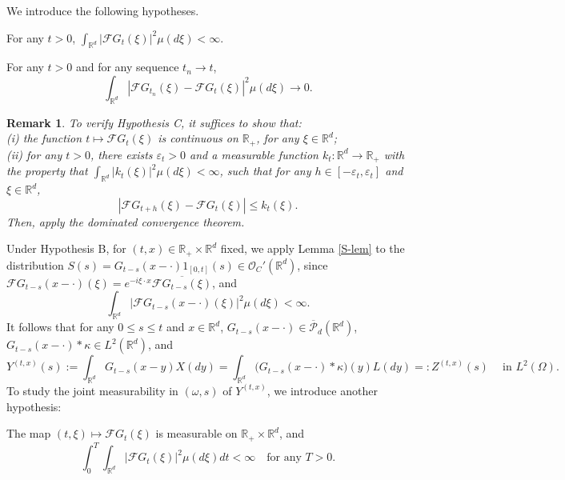 \documentclass[12pt]{article}
\newtheorem{remark}[theorem]{Remark}
\def\cF{\mathcal{F}}
\def\cO{\mathcal{O}}
\def\cP{\mathcal{P}}
\def\bR{\mathbb{R}}
\def\e{\varepsilon}
\def\k{\kappa}
\begin{document}
We introduce the following hypotheses.

\medskip


 For any $t>0$, $\int_{\bR^d} |\cF G_t(\xi)|^2 \mu(d\xi)<\infty$. 

\medskip

For any $t>0$ and for any sequence $t_n \to t$, 
\[
\int_{\bR^d}|\cF G_{t_n}(\xi)-\cF G_t(\xi)|^2 \mu(d\xi) \to 0.
\]


\begin{remark}
\label{rem-HypB}
{\rm To verify Hypothesis C, it suffices to show that:\\
(i) the function $t \mapsto \cF G_t(\xi)$ is continuous on $\bR_{+}$, for any $\xi\in \bR^d$;\\
(ii) for any $t>0$, there exists $\e_t>0$ and a measurable function $k_t:\bR^d \to \bR_{+}$ with the property that $\int_{\bR^d}|k_t(\xi)|^2 \mu(d\xi)<\infty$, such that for any $h \in [-\e_t,\e_t]$ and $\xi \in \bR^d$,
\[
|\cF G_{t+h}(\xi)-\cF G_t(\xi)| \leq k_t(\xi).
\]
Then, apply the dominated convergence theorem.}
\end{remark}


\medskip



Under Hypothesis B, for $(t,x) \in \bR_{+} \times \bR^d$ fixed, we apply Lemma \ref{S-lem} to the distribution
$S(s)=G_{t-s}(x-\cdot)1_{[0,t]}(s) \in \cO_{C}'(\bR^d)$,
 since $\cF G_{t-s}(x-\cdot)(\xi)=e^{-i \xi \cdot x} \overline{\cF G_{t-s}(\xi)}$, and
\[
\int_{\bR^d} |\cF G_{t-s}(x-\cdot)(\xi)|^2 \mu(d\xi)<\infty.
\]
It follows that  for any $0\leq s\leq t$ and $x \in \bR^d$, $G_{t-s}(x-\cdot) \in \overline{\cP}_d(\bR^d)$, $G_{t-s}(x-\cdot)*\k \in L^2(\bR^d)$, and 
\begin{equation}
\label{def-Y}
Y^{(t,x)}(s):=\int_{\bR^d} G_{t-s}(x-y)X(dy)=\int_{\bR^d} \big(G_{t-s}(x-\cdot)*\k \big)(y)L(dy)=:Z^{(t,x)}(s) \quad \ \mbox{in $L^2(\Omega)$}.
\end{equation}
To study the joint measurability in $(\omega,s)$ of $Y^{(t,x)}$, we introduce another hypothesis:

\medskip



 The map $(t,\xi)\mapsto \cF G_t(\xi)$ is measurable on $\bR_{+} \times \bR^d$, and  
\[
\int_0^T \int_{\bR^d} |\cF G_t(\xi)|^2 \mu(d\xi)dt<\infty \quad \mbox{for any $T>0$}.
\]
\end{document}
